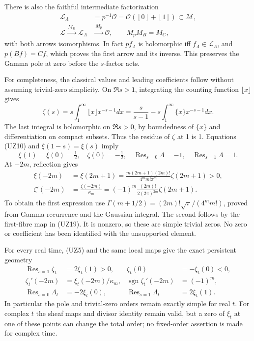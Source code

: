\documentclass[
  10pt,
  a4paper,
]{article}
\begin{document}
There is also the faithful intermediate factorization \[
\begin{aligned}
\mathcal L_\Lambda&=p^{-1}\mathcal O
=\mathcal O([0]+[1])\subset\mathcal M,\\
\mathcal L \xrightarrow{\,M_B\,}\mathcal L_\Lambda
&\xrightarrow{\,M_p\,}\mathcal O,\qquad
M_pM_B=M_C,
\end{aligned}\tag{UZ20}
\] with both arrows isomorphisms. In fact \(pf_\Lambda\) is holomorphic
iff \(f_\Lambda\in\mathcal L_\Lambda\), and \(p(Bf)=Cf\), which proves
the first arrow and its inverse. This preserves the Gamma pole at zero
before the \(s\)-factor acts.

For completeness, the classical values and leading coefficients follow
without assuming trivial-zero simplicity. On \(\Re s>1\), integrating
the counting function \(\lfloor x\rfloor\) gives \[
\zeta(s)=s\int_1^\infty \lfloor x\rfloor x^{-s-1}dx
=\frac{s}{s-1}-s\int_1^\infty\{x\}x^{-s-1}dx.
\tag{UZ21}
\] The last integral is holomorphic on \(\Re s>0\), by boundedness of
\(\{x\}\) and differentiation on compact subsets. Thus the residue of
\(\zeta\) at 1 is 1. Equations (UZ10) and \(\xi(1-s)=\xi(s)\) imply \[
\xi(1)=\xi(0)=\tfrac12,\quad
\zeta(0)=-\tfrac12,\quad
\operatorname{Res}_{s=0}\Lambda=-1,\quad
\operatorname{Res}_{s=1}\Lambda=1.
\tag{UZ22}
\] At \(-2m\), reflection gives \[
\begin{aligned}
\xi(-2m)&=\xi(2m+1)
=\frac{m(2m+1)(2m)!}{4^m m!\pi^m}\zeta(2m+1)>0,\\
\zeta'(-2m)&=\frac{\xi(-2m)}{\kappa_m}
=(-1)^m\frac{(2m)!}{2(2\pi)^{2m}}\zeta(2m+1).
\end{aligned}\tag{UZ23}
\] To obtain the first expression use
\(\Gamma(m+1/2)=(2m)!\sqrt\pi/(4^m m!)\), proved from Gamma recurrence
and the Gaussian integral. The second follows by the first-fibre map in
(UZ19). It is nonzero, so these are simple trivial zeros. No zero or
coefficient has been identified with the unsupported element.

For every real time, (UZ5) and the same local maps give the exact
persistent geometry \[
\begin{aligned}
\operatorname{Res}_{s=1}\zeta_t&=2\xi_t(1)>0,&
\zeta_t(0)&=-\xi_t(0)<0,\\
\zeta_t'(-2m)&=\xi_t(-2m)/\kappa_m,&
\operatorname{sgn}\zeta_t'(-2m)&=(-1)^m,\\
\operatorname{Res}_{s=0}\Lambda_t&=-2\xi_t(0),&
\operatorname{Res}_{s=1}\Lambda_t&=2\xi_t(1).
\end{aligned}\tag{UZ24}
\] In particular the pole and trivial-zero orders remain exactly simple
for real \(t\). For complex \(t\) the sheaf maps and divisor identity
remain valid, but a zero of \(\xi_t\) at one of these points can change
the total order; no fixed-order assertion is made for complex time.
\end{document}
